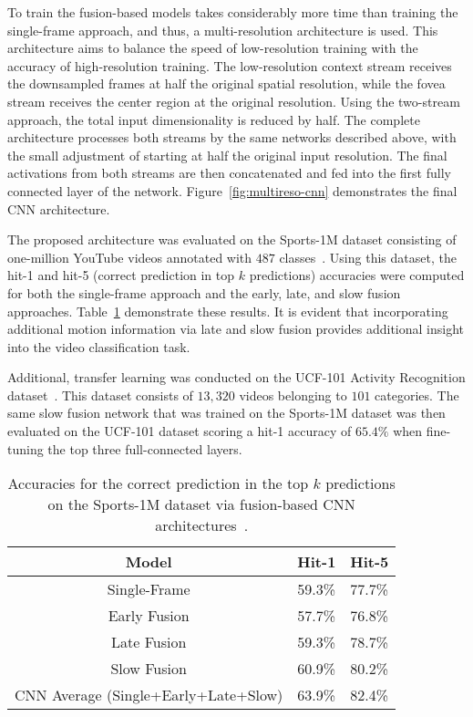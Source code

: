 To train the fusion-based models takes considerably more time than training the single-frame approach, and thus, a multi-resolution architecture is used. This architecture aims to balance the speed of low-resolution training with the accuracy of high-resolution training. The low-resolution context stream receives the downsampled frames at half the original spatial resolution, while the fovea stream receives the center region at the original resolution. Using the two-stream approach, the total input dimensionality is reduced by half. The complete architecture processes both streams by the same networks described above, with the small adjustment of starting at half the original input resolution. The final activations from both streams are then concatenated and fed into the first fully connected layer of the network. Figure~\ref{fig:multireso-cnn} demonstrates the final CNN architecture.

The proposed architecture was evaluated on the Sports-1M dataset consisting of one-million YouTube videos annotated with $487$ classes~\cite{LargeScaleFusionCNN:2014}. Using this dataset, the hit-1 and hit-5 (correct prediction in top $k$ predictions) accuracies were computed for both the single-frame approach and the early, late, and slow fusion approaches. Table~\ref{tab:fusion-cnn} demonstrate these results. It is evident that incorporating additional motion information via late and slow fusion provides additional insight into the video classification task.

Additional, transfer learning was conducted on the UCF-101 Activity Recognition dataset~\cite{UCF-101}. This dataset consists of $13,320$ videos belonging to $101$ categories. The same slow fusion network that was trained on the Sports-1M dataset was then evaluated on the UCF-101 dataset scoring a hit-1 accuracy of $65.4\%$ when fine-tuning the top three full-connected layers.

\begin{table}[ht]
  \centering
    \begin{tabular}{|c|l|l|}
      \hline
      \textbf{Model} & \textbf{Hit-1} & \textbf{Hit-5}\\
      \hline
      Single-Frame & 59.3\% & 77.7\% \\
      Early Fusion & 57.7\% & 76.8\% \\
      Late Fusion  & 59.3\% & 78.7\% \\
      Slow Fusion  & 60.9\% & 80.2\% \\
      CNN Average (Single+Early+Late+Slow) & 63.9\% & 82.4\% \\
      \hline
    \end{tabular}
    \caption{Accuracies for the correct prediction in the top $k$ predictions on the Sports-1M dataset via fusion-based CNN architectures~\cite{LargeScaleFusionCNN:2014}.}
    \label{tab:fusion-cnn}
\end{table}

